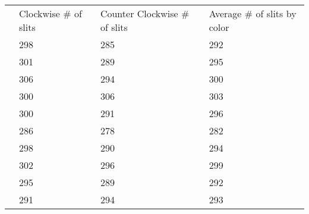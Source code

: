 \documentclass{article}
\begin{document}
\begin{table}[H]
\begin{tabular}{llll}
\cline{2-4}
\multicolumn{1}{l|}{}   & \multicolumn{1}{l|}{Clockwise \# of slits} & \multicolumn{1}{l|}{Counter Clockwise \# of slits} & \multicolumn{1}{l|}{Average \# of slits by color} \\ \cline{2-4} 
\multicolumn{1}{l|}{}   & \multicolumn{1}{l|}{298}                   & \multicolumn{1}{l|}{285}                           & \multicolumn{1}{l|}{292}                          \\ \cline{2-4} 
\multicolumn{1}{l|}{}   & \multicolumn{1}{l|}{301}                   & \multicolumn{1}{l|}{289}                           & \multicolumn{1}{l|}{295}                          \\ \cline{2-4} 
\multicolumn{1}{l|}{}   & \multicolumn{1}{l|}{306}                   & \multicolumn{1}{l|}{294}                           & \multicolumn{1}{l|}{300}                          \\ \cline{2-4} 
\multicolumn{1}{l|}{}   & \multicolumn{1}{l|}{300}                   & \multicolumn{1}{l|}{306}                           & \multicolumn{1}{l|}{303}                          \\ \cline{2-4} 
\multicolumn{1}{l|}{}   & \multicolumn{1}{l|}{300}                   & \multicolumn{1}{l|}{291}                           & \multicolumn{1}{l|}{296}                          \\ \cline{2-4} 
\multicolumn{1}{l|}{}   & \multicolumn{1}{l|}{286}                   & \multicolumn{1}{l|}{278}                           & \multicolumn{1}{l|}{282}                          \\ \cline{2-4} 
\multicolumn{1}{l|}{}   & \multicolumn{1}{l|}{298}                   & \multicolumn{1}{l|}{290}                           & \multicolumn{1}{l|}{294}                          \\ \cline{2-4} 
\multicolumn{1}{l|}{}   & \multicolumn{1}{l|}{302}                   & \multicolumn{1}{l|}{296}                           & \multicolumn{1}{l|}{299}                          \\ \cline{2-4} 
\multicolumn{1}{l|}{}   & \multicolumn{1}{l|}{295}                   & \multicolumn{1}{l|}{289}                           & \multicolumn{1}{l|}{292}                          \\ \cline{2-4} 
\multicolumn{1}{l|}{}   & \multicolumn{1}{l|}{291}                   & \multicolumn{1}{l|}{294}                           & \multicolumn{1}{l|}{293}                          \\ \cline{2-4} 

\end{tabular}
\end{table}
\end{document}
